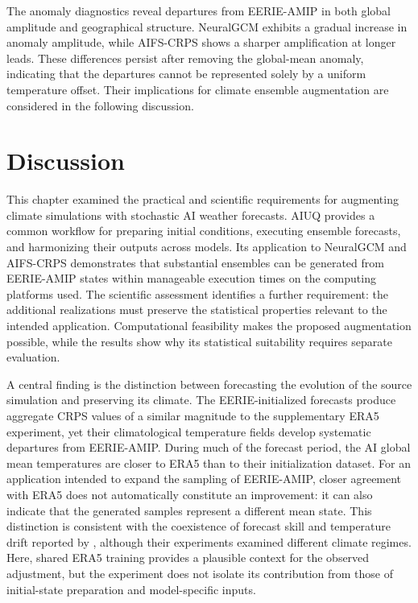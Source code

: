 The anomaly diagnostics reveal departures from EERIE-AMIP in both global amplitude and geographical structure. NeuralGCM exhibits a gradual increase in anomaly amplitude, while AIFS-CRPS shows a sharper amplification at longer leads. These differences persist after removing the global-mean anomaly, indicating that the departures cannot be represented solely by a uniform temperature offset. Their implications for climate ensemble augmentation are considered in the following discussion.


\section{Discussion}
\label{sec:discussion}

This chapter examined the practical and scientific requirements for augmenting climate simulations with stochastic AI weather forecasts. AIUQ provides a common workflow for preparing initial conditions, executing ensemble forecasts, and harmonizing their outputs across models. Its application to NeuralGCM and AIFS-CRPS demonstrates that substantial ensembles can be generated from EERIE-AMIP states within manageable execution times on the computing platforms used. The scientific assessment identifies a further requirement: the additional realizations must preserve the statistical properties relevant to the intended application. Computational feasibility makes the proposed augmentation possible, while the results show why its statistical suitability requires separate evaluation.

A central finding is the distinction between forecasting the evolution of the source simulation and preserving its climate. The EERIE-initialized forecasts produce aggregate CRPS values of a similar magnitude to the supplementary ERA5 experiment, yet their climatological temperature fields develop systematic departures from EERIE-AMIP. During much of the forecast period, the AI global mean temperatures are closer to ERA5 than to their initialization dataset. For an application intended to expand the sampling of EERIE-AMIP, closer agreement with ERA5 does not automatically constitute an improvement: it can also indicate that the generated samples represent a different mean state. This distinction is consistent with the coexistence of forecast skill and temperature drift reported by \citet{rackow_robustness_2024}, although their experiments examined different climate regimes. Here, shared ERA5 training provides a plausible context for the observed adjustment, but the experiment does not isolate its contribution from those of initial-state preparation and model-specific inputs.

